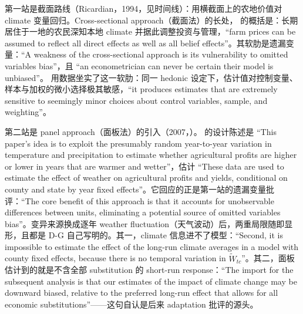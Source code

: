 第一站是截面路线（Ricardian，1994，见时间线）：用横截面上的农地价值对 climate 变量回归。Cross-sectional approach（截面法）的长处，\citet{hsiang2016climate} 的概括是：长期居住于一地的农民深知本地 climate 并据此调整投资与管理，``farm prices can be assumed to reflect all direct effects as well as all belief effects''\citep[第~5 页；direct effects（直接效应）指 climate 经由 weather 实现的直接影响，belief effects（信念效应）指主体因相信本地气候如此而做的调整，即 adaptation 行为，区分随 Hsiang 2016]{hsiang2016climate}。其软肋是遗漏变量：``A weakness of the cross-sectional approach is its vulnerability to omitted variables bias''\citep[第~5 页]{hsiang2016climate}，且 ``an econometrician can never be certain their model is unbiased''\citep[第~5 页]{hsiang2016climate}。\citet{deschenes2007economic} 用数据坐实了这一软肋：同一 hedonic 设定下，估计值对控制变量、样本与加权的微小选择极其敏感，``it produces estimates that are extremely sensitive to seemingly minor choices about control variables, sample, and weighting''\citep[第~354 页]{deschenes2007economic}。

第二站是 panel approach（面板法）的引入（2007，）。\citet{deschenes2007economic} 的设计陈述是 ``This paper's idea is to exploit the presumably random year-to-year variation in temperature and precipitation to estimate whether agricultural profits are higher or lower in years that are warmer and wetter''\citep[第~355 页]{deschenes2007economic}，估计 ``These data are used to estimate the effect of weather on agricultural profits and yields, conditional on county and state by year fixed effects''\citep[第~355 页；此思路本身可追溯到 Huntington 1922，考据见 \citealp{hsiang2016climate} 第~6--7 页]{deschenes2007economic}。它回应的正是第一站的遗漏变量批评：``The core benefit of this approach is that it accounts for unobservable differences between units, eliminating a potential source of omitted variables bias''\citep[第~7 页]{hsiang2016climate}。变异来源换成逐年 weather fluctuation（天气波动）后，两重局限随即显形，且都是 D-G 自己写明的。其一，climate 信息进不了模型：``Second, it is impossible to estimate the effect of the long-run climate averages in a model with county fixed effects, because there is no temporal variation in $\widetilde{W}_{tc}$''\citep[第~367 页；$\widetilde{W}_{tc}$ 为气候 normals，即各县的长期气候变量——\citet{merel2021climate} 第~1207 页脚注所引即此句]{deschenes2007economic}。其二，面板估计到的就是不含全部 substitution 的 short-run response：``The import for the subsequent analysis is that our estimates of the impact of climate change may be downward biased, relative to the preferred long-run effect that allows for all economic substitutions''\citep[第~359 页]{deschenes2007economic}——这句自认是后来 adaptation 批评的源头。

